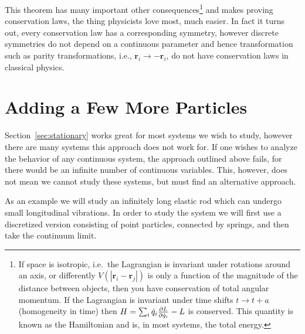 This theorem has many important other consequences\footnote{If space is
isotropic, i.e.\ the Lagrangian is invariant under rotations around an axis, or
differently \(V(|\mathbf{r}_i - \mathbf{r}_j|)\) is only a function of the
magnitude of the distance between objects, then you have conservation of total
angular momentum. If the Lagrangian is invariant under time shifts
\(t\to t + a\) (homogeneity in time) then \(H = \sum_i\dot{q}_i\pdv{L}{\dot{q}_i} - L\)
is conserved. This quantity is known as the Hamiltonian and is, in most systems,
the total energy.} and makes proving conservation laws, the thing physicists
love most, much easier. In fact it turns out, every conservation law has a
corresponding symmetry, however discrete symmetries do not depend on a
continuous parameter and hence transformation such as parity transformations,
i.e.,  \(\mathbf{r}_i\to-\mathbf{r}_i\), do not have conservation laws in
classical physics.

\section{Adding a Few More Particles}\label{moreParticles}
Section~\ref{sec:stationary} works great for most systems we wish to study,
however there are many systems this approach does not work for. If one wishes to
analyze the behavior of any continuous system, the approach outlined above
fails, for there would be an infinite number of continuous variables. This,
however, does not mean we cannot study these systems, but must find an
alternative approach.

As an example we will study an infinitely long elastic rod which can undergo
small longitudinal vibrations. In order to study the system we will first use a
discretized version consisting of point particles, connected by springs, and
then take the continuum limit.

